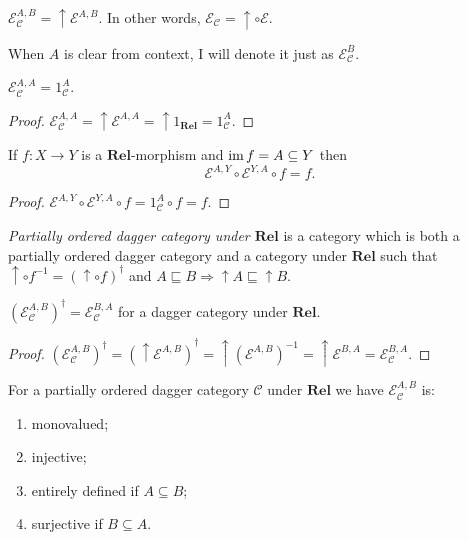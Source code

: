 \begin{defn}
  $\mathcal{E}_{\mathcal{C}}^{A,B} = \uparrow \mathcal{E}^{A,B}$. In
  other words, $\mathcal{E}_{\mathcal{C}} = \uparrow \circ \mathcal{E}$.
  
  When $A$ is clear from context, I will denote it just as $\mathcal{E}_{\mathcal{C}}^B$.
\end{defn}

\begin{prop}
  $\mathcal{E}_{\mathcal{C}}^{A,A} = 1_{\mathcal{C}}^A$.
\end{prop}

\begin{proof}
  $\mathcal{E}_{\mathcal{C}}^{A,A} = \uparrow \mathcal{E}^{A,A} =
  \uparrow 1_{\mathbf{Rel}} = 1_{\mathcal{C}}^A$.
\end{proof}

\begin{prop}
  If $f : X \rightarrow Y$ is a $\mathbf{Rel}$-morphism and
  $\operatorname{im} f = A \subseteq Y$ then
  \[ \mathcal{E}^{A,Y} \circ \mathcal{E}^{Y,A} \circ f = f. \]
\end{prop}

\begin{proof}
  $\mathcal{E}^{A,Y} \circ \mathcal{E}^{Y,A} \circ f = 1_{\mathcal{C}}^A
  \circ f = f$.
\end{proof}

\begin{defn}
  \emph{Partially ordered dagger category under $\mathbf{Rel}$} is
  a category which is both a partially ordered dagger category and a category
  under $\mathbf{Rel}$ such that $\uparrow \circ f^{- 1} = (\uparrow
  \circ f)^{\dagger}$ and $A \sqsubseteq B \Rightarrow \uparrow A \sqsubseteq
  \uparrow B$.
\end{defn}

\begin{prop}
  $(\mathcal{E}_{\mathcal{C}}^{A,B})^{\dagger} = \mathcal{E}_{\mathcal{C}}^{B,A}$ for a dagger category under
  $\mathbf{Rel}$.
\end{prop}

\begin{proof}
  $(\mathcal{E}_{\mathcal{C}}^{A,B})^{\dagger} = (\uparrow \mathcal{E}^{A,B})^{\dagger} = \uparrow (\mathcal{E}^{A,B})^{- 1} =
  \uparrow \mathcal{E}^{B,A} = \mathcal{E}_{\mathcal{C}}^{B,A}$.
\end{proof}

\begin{prop}
  For a partially ordered dagger category $\mathcal{C}$ under
  $\mathbf{Rel}$ we have $\mathcal{E}_{\mathcal{C}}^{A,B}$ is:
  \begin{enumerate}
    \item monovalued;
    
    \item injective;
    
    \item entirely defined if $A \subseteq B$;
    
    \item surjective if $B \subseteq A$.
  \end{enumerate}
\end{prop}

